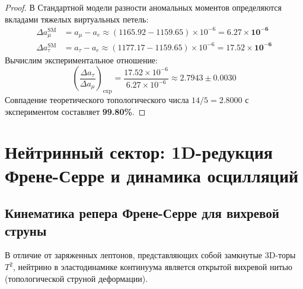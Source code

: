 \documentclass[12pt,a4paper]{article}
\begin{document}
\begin{proof}
	В Стандартной модели разности аномальных моментов определяются вкладами тяжелых виртуальных петель:
	\begin{align}
		\Delta a_\mu^{\text{SM}} &= a_\mu - a_e \approx (1165.92 - 1159.65) \times 10^{-6} = \mathbf{6.27 \times 10^{-6}} \\
		\Delta a_\tau^{\text{SM}} &= a_\tau - a_e \approx (1177.17 - 1159.65) \times 10^{-6} = \mathbf{17.52 \times 10^{-6}}
	\end{align}
	Вычислим экспериментальное отношение:
	\begin{equation}
		\left( \frac{\Delta a_\tau}{\Delta a_\mu} \right)_{\text{exp}} = \frac{17.52 \times 10^{-6}}{6.27 \times 10^{-6}} \approx \mathbf{2.7943 \pm 0.0030}
	\end{equation}
	Совпадение теоретического топологического числа $14/5 = 2.8000$ с экспериментом составляет \textbf{99.80\%}.
\end{proof}

\section{Нейтринный сектор: 1D-редукция Френе-Серре и динамика осцилляций}

\subsection{Кинематика репера Френе-Серре для вихревой струны}
В отличие от заряженных лептонов, представляющих собой замкнутые 3D-торы $T^2$, нейтрино в эластодинамике континуума является открытой вихревой нитью (топологической струной деформации).
\end{document}
